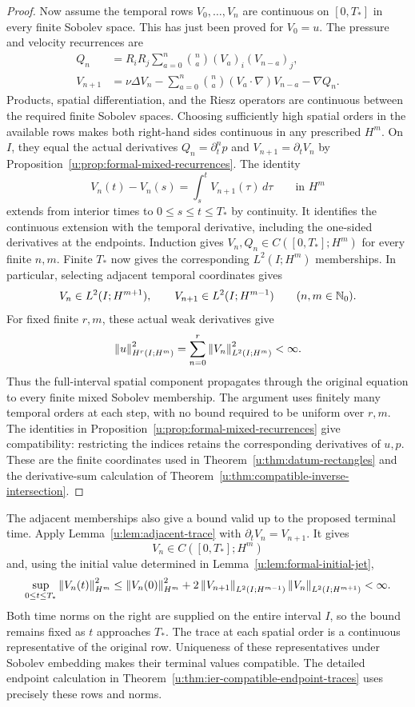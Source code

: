 \begin{proof}
Now assume the temporal rows \(V_0,\ldots,V_n\) are continuous on
\([0,T_*]\) in every finite Sobolev space. This has just been proved
for \(V_0=u\). The pressure and velocity recurrences are
\[
 \begin{aligned}
 Q_n&=R_iR_j\sum_{a=0}^n\binom na(V_a)_i(V_{n-a})_j,\\
 V_{n+1}&=\nu\Delta V_n
 -\sum_{a=0}^n\binom na(V_a\cdot\nabla)V_{n-a}-\nabla Q_n.
 \end{aligned}
\]
Products, spatial differentiation, and the Riesz operators are continuous
between the required finite Sobolev spaces. Choosing sufficiently high
spatial orders in the available rows makes both right-hand sides continuous
in any prescribed \(H^m\). On \(I\), they equal the actual derivatives
\(Q_n=\partial_t^np\) and \(V_{n+1}=\partial_tV_n\) by
Proposition~\ref{u:prop:formal-mixed-recurrences}. The identity
\[
 V_n(t)-V_n(s)=\int_s^tV_{n+1}(\tau)\,d\tau
 \qquad\text{in }H^m
\]
extends from interior times to \(0\le s\le t\le T_*\) by continuity.
It identifies the continuous extension with the temporal derivative,
including the one-sided derivatives at the endpoints. Induction gives
\(V_n,Q_n\in C([0,T_*];H^m)\) for every finite \(n,m\).
Finite \(T_*\) now gives the corresponding \(L^2(I;H^m)\) memberships.
In particular, selecting adjacent temporal coordinates gives
\[
 V_n\in L^2(I;H^{m+1}),\qquad
 V_{n+1}\in L^2(I;H^{m-1})
 \qquad(n,m\in\mathbb N_0).
\]
For fixed finite \(r,m\), these actual weak derivatives give
\[
 \left\lVert u\right\rVert_{H^r(I;H^m)}^2
 =\sum_{n=0}^r\left\lVert V_n\right\rVert_{L^2(I;H^m)}^2<\infty.
\]
Thus the full-interval spatial component propagates through
the original equation to every finite mixed Sobolev membership. The argument
uses finitely many temporal orders at each step, with no bound required to
be uniform over \(r,m\). The identities in
Proposition~\ref{u:prop:formal-mixed-recurrences} give compatibility:
restricting the indices retains the corresponding derivatives of \(u,p\).
These are the finite coordinates used in
Theorem~\ref{u:thm:datum-rectangles} and the derivative-sum calculation of
Theorem~\ref{u:thm:compatible-inverse-intersection}.
\end{proof}

The adjacent memberships also give a bound valid up to the proposed terminal
time. Apply Lemma~\ref{u:lem:adjacent-trace} with
\(\partial_tV_n=V_{n+1}\). It gives
\[
 V_n\in C([0,T_*];H^m)
\]
and, using the initial value determined in
Lemma~\ref{u:lem:formal-initial-jet},
\[
 \sup_{0\le t\le T_*}\left\lVert V_n(t)\right\rVert_{H^m}^2
 \le\left\lVert V_n(0)\right\rVert_{H^m}^2
 +2\left\lVert V_{n+1}\right\rVert_{L^2(I;H^{m-1})}
    \left\lVert V_n\right\rVert_{L^2(I;H^{m+1})}<\infty.
\]
Both time norms on the right are supplied on the entire interval \(I\),
so the bound remains fixed as \(t\) approaches \(T_*\).
The trace at each spatial order is a continuous representative of the
original row. Uniqueness of these representatives under Sobolev embedding
makes their terminal values compatible. The detailed endpoint calculation
in Theorem~\ref{u:thm:ier-compatible-endpoint-traces} uses precisely these
rows and norms.

